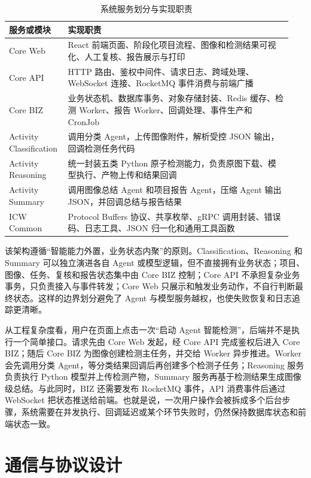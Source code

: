 \begin{table}[!htb]
  \caption{系统服务划分与实现职责}\label{tab:service-division}
  \centering
  \begin{tabular}{@{}p{0.18\linewidth}p{0.76\linewidth}@{}} \toprule
    \textbf{服务或模块} & \textbf{实现职责} \\ \midrule
    Core Web & React 前端页面、阶段化项目流程、图像和检测结果可视化、人工复核、报告展示与打印 \\
    Core API & HTTP 路由、鉴权中间件、请求日志、跨域处理、WebSocket 连接、RocketMQ 事件消费与前端广播 \\
    Core BIZ & 业务状态机、数据库事务、对象存储封装、Redis 缓存、检测 Worker、报告 Worker、回调处理、事件生产和 CronJob \\
    Activity Classification & 调用分类 Agent，上传图像附件，解析受控 JSON 输出，回调检测任务代码 \\
    Activity Reasoning & 统一封装五类 Python 原子检测能力，负责原图下载、模型执行、产物上传和结果回调 \\
    Activity Summary & 调用图像总结 Agent 和项目报告 Agent，压缩 Agent 输出 JSON，并回调总结与报告结果 \\
    ICW Common & Protocol Buffers 协议、共享枚举、gRPC 调用封装、错误码、日志工具、JSON 归一化和通用工具函数 \\ \bottomrule
  \end{tabular}
\end{table}

该架构遵循“智能能力外置，业务状态内聚”的原则。Classification、Reasoning 和 Summary 可以独立演进各自 Agent 或模型逻辑，但不直接拥有业务状态；项目、图像、任务、复核和报告状态集中由 Core BIZ 控制；Core API 不承担复杂业务事务，只负责接入与事件转发；Core Web 只展示和触发业务动作，不自行判断最终状态。这样的边界划分避免了 Agent 与模型服务越权，也使失败恢复和日志追踪更清晰。

从工程复杂度看，用户在页面上点击一次“启动 Agent 智能检测”，后端并不是执行一个简单接口。请求先由 Core Web 发起，经 Core API 完成鉴权后进入 Core BIZ；随后 Core BIZ 为图像创建检测主任务，并交给 Worker 异步推进。Worker 会先调用分类 Agent，等分类结果回调后再创建多个检测子任务；Reasoning 服务负责执行 Python 模型并上传检测产物，Summary 服务再基于检测结果生成图像级总结。与此同时，BIZ 还需要发布 RocketMQ 事件，API 消费事件后通过 WebSocket 把状态推送给前端。也就是说，一次用户操作会被拆成多个后台步骤，系统需要在并发执行、回调延迟或某个环节失败时，仍然保持数据库状态和前端状态一致。

\section{通信与协议设计}
\label{sec:implementation-communication-and-protocol-design}

